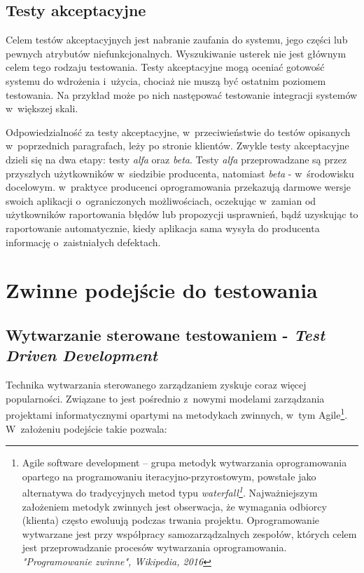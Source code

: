 \subsection{Testy akceptacyjne}

Celem testów akceptacyjnych jest nabranie zaufania do systemu, jego części lub pewnych atrybutów niefunkcjonalnych. Wyszukiwanie usterek nie jest głównym celem tego rodzaju testowania. Testy akceptacyjne mogą oceniać gotowość systemu do wdrożenia i~użycia, chociaż nie muszą być ostatnim poziomem testowania. Na przykład może po nich następować testowanie integracji systemów w~większej skali.

Odpowiedzialność za testy akceptacyjne, w~przeciwieństwie do testów opisanych w~poprzednich paragrafach, leży po stronie klientów. Zwykle testy akceptacyjne dzieli się na dwa etapy: testy \textit{alfa} oraz \textit{beta}. Testy \textit{alfa} przeprowadzane są przez przyszłych użytkowników w~siedzibie producenta, natomiast \textit{beta} - w~środowisku docelowym. w~praktyce producenci oprogramowania przekazują darmowe wersje swoich aplikacji o~ograniczonych możliwościach, oczekując w~zamian od użytkowników raportowania błędów lub propozycji usprawnień, bądź uzyskując to raportowanie automatycznie, kiedy aplikacja sama wysyła do producenta informację o~zaistniałych defektach.\cite{bib:sylabus:foundation}

\section{Zwinne podejście do testowania}
\subsection{Wytwarzanie sterowane testowaniem - \textit{Test Driven \newline Development}}
\label{test_driven_development}
Technika wytwarzania sterowanego zarządzaniem zyskuje coraz więcej popularności. Związane to jest pośrednio z~nowymi modelami zarządzania projektami informatycznymi opartymi na metodykach zwinnych, w~tym Agile\footnote{Agile software development – grupa metodyk wytwarzania oprogramowania opartego na programowaniu iteracyjno-przyrostowym, powstałe jako alternatywa do tradycyjnych metod typu \textit{waterfall\footnote{Iteracyjny model kaskadowy (ang. waterfall model) – jeden z~kilku rodzajów procesów tworzenia oprogramowania zdefiniowany w~inżynierii oprogramowania. Polega on na wykonywaniu podstawowych czynności jako odrębnych faz projektowych, w~porządku jeden po drugim. Każda czynność to kolejny schodek (kaskada). Jeśli któraś z~faz zwróci niesatysfakcjonujący produkt, należy się cofnąć wykonując kolejne iteracje aż do momentu kiedy otrzymano satysfakcjonujący produkt na końcu schodków. \textit{"Model kaskadowy", Wikipedia, 2014}}}. Najważniejszym założeniem metodyk zwinnych jest obserwacja, że wymagania odbiorcy (klienta) często ewoluują podczas trwania projektu. Oprogramowanie wytwarzane jest przy współpracy samozarządzalnych zespołów, których celem jest przeprowadzanie procesów wytwarzania oprogramowania. \textit{"Programowanie zwinne", Wikipedia, 2016}}. W~założeniu podejście takie pozwala:

